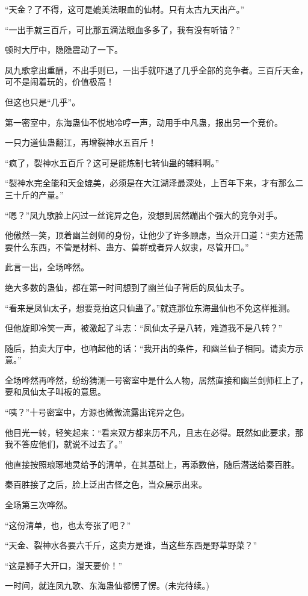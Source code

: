 \begin{this_body}
“天金？了不得，这可是媲美法眼血的仙材。只有太古九天出产。”

“一出手就三百斤，可比那五滴法眼血多多了，我有没有听错？”

顿时大厅中，隐隐震动了一下。

凤九歌拿出重酬，不出手则已，一出手就吓退了几乎全部的竞争者。三百斤天金，可不是闹着玩的，价值极高！

但这也只是“几乎”。

第一密室中，东海蛊仙不悦地冷哼一声，动用手中凡蛊，报出另一个竞价。

一只力道仙蛊翻江，再增裂神水五百斤！

“疯了，裂神水五百斤？这可是能炼制七转仙蛊的辅料啊。”

“裂神水完全能和天金媲美，必须是在大江湖泽最深处，上百年下来，才有那么二三十斤的产量。”

“嗯？”凤九歌脸上闪过一丝诧异之色，没想到居然蹦出个强大的竞争对手。

他傲然一笑，顶着幽兰剑师的身份，让他少了许多顾虑，当众开口道：“卖方还需要什么东西，不管是材料、蛊方、兽群或者异人奴隶，尽管开口。”

此言一出，全场哗然。

绝大多数的蛊仙，都在第一时间想到了幽兰仙子背后的凤仙太子。

“看来是凤仙太子，想要竞拍这只仙蛊了。”就连那位东海蛊仙也不免这样推测。

但他旋即冷笑一声，被激起了斗志：“凤仙太子是八转，难道我不是八转？”

随后，拍卖大厅中，也响起他的话：“我开出的条件，和幽兰仙子相同。请卖方示意。”

全场哗然再哗然，纷纷猜测一号密室中是什么人物，居然直接和幽兰剑师杠上了，要和凤仙太子叫板的意思。

“咦？”十号密室中，方源也微微流露出诧异之色。

他目光一转，轻笑起来：“看来双方都来历不凡，且志在必得。既然如此要求，那我不答应他们，就说不过去了。”

他直接按照琅琊地灵给予的清单，在其基础上，再添数倍，随后潜送给秦百胜。

秦百胜接了之后，脸上泛出古怪之色，当众展示出来。

全场第三次哗然。

“这份清单，也，也太夸张了吧？”

“天金、裂神水各要六千斤，这卖方是谁，当这些东西是野草野菜？”

“这是狮子大开口，漫天要价！”

一时间，就连凤九歌、东海蛊仙都愣了愣。(未完待续。)

\end{this_body}

